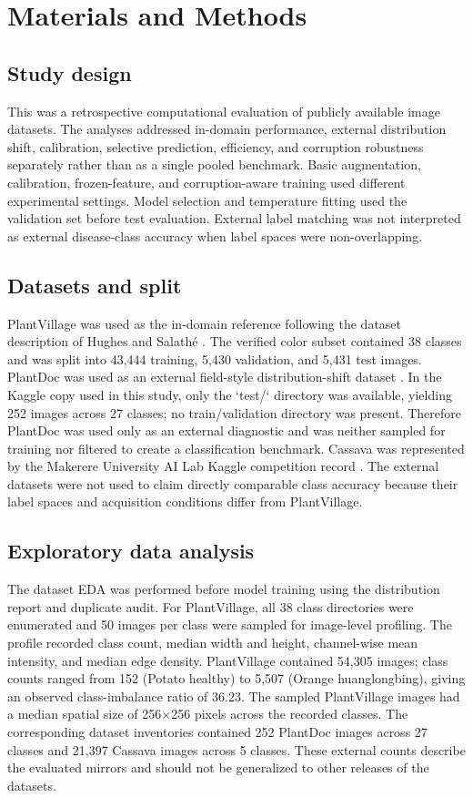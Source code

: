 \documentclass[12pt]{article}
\begin{document}
\section{Materials and Methods}
\subsection{Study design}
This was a retrospective computational evaluation of publicly available image datasets. The analyses addressed in-domain performance, external distribution shift, calibration, selective prediction, efficiency, and corruption robustness separately rather than as a single pooled benchmark. Basic augmentation, calibration, frozen-feature, and corruption-aware training used different experimental settings. Model selection and temperature fitting used the validation set before test evaluation. External label matching was not interpreted as external disease-class accuracy when label spaces were non-overlapping.

\subsection{Datasets and split}
PlantVillage was used as the in-domain reference following the dataset description of Hughes and Salathé \citep{hughes2015}. The verified color subset contained 38 classes and was split into 43,444 training, 5,430 validation, and 5,431 test images. PlantDoc was used as an external field-style distribution-shift dataset \citep{singh2020}. In the Kaggle copy used in this study, only the `test/` directory was available, yielding 252 images across 27 classes; no train/validation directory was present. Therefore PlantDoc was used only as an external diagnostic and was neither sampled for training nor filtered to create a classification benchmark. Cassava was represented by the Makerere University AI Lab Kaggle competition record \citep{makerere2020}. The external datasets were not used to claim directly comparable class accuracy because their label spaces and acquisition conditions differ from PlantVillage.

\subsection{Exploratory data analysis}
The dataset EDA was performed before model training using the distribution report and duplicate audit. For PlantVillage, all 38 class directories were enumerated and 50 images per class were sampled for image-level profiling. The profile recorded class count, median width and height, channel-wise mean intensity, and median edge density. PlantVillage contained 54,305 images; class counts ranged from 152 (Potato healthy) to 5,507 (Orange huanglongbing), giving an observed class-imbalance ratio of 36.23. The sampled PlantVillage images had a median spatial size of 256$\times$256 pixels across the recorded classes. The corresponding dataset inventories contained 252 PlantDoc images across 27 classes and 21,397 Cassava images across 5 classes. These external counts describe the evaluated mirrors and should not be generalized to other releases of the datasets.
\end{document}
